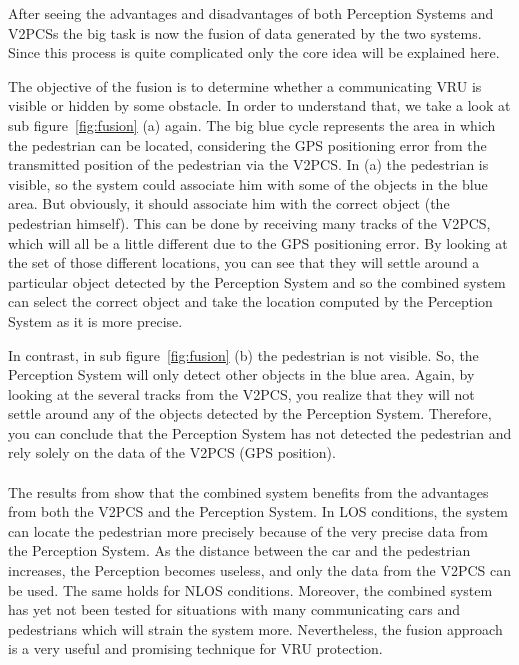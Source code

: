 \documentclass[]{ccs-thesis}
\begin{document}
After seeing the advantages and disadvantages of both Perception Systems and \acp{V2PCS} the big task is now the fusion of data generated by the two systems. Since this process is quite complicated only the core idea will be explained here.

The objective of the fusion is to determine whether a communicating \ac{VRU} is visible or hidden by some obstacle. In order to understand that, we take a look at sub figure~\ref{fig:fusion} (a) again. The big blue cycle represents the area in which the pedestrian can be located, considering the GPS positioning error from the transmitted position of the pedestrian via the \ac{V2PCS}. In (a) the pedestrian is visible, so the system could associate him with some of the objects in the blue area. But obviously, it should associate him with the correct object (the pedestrian himself). This can be done by receiving many tracks of the \ac{V2PCS}, which will all be a little different due to the GPS positioning error. By looking at the set of those different locations, you can see that they will settle around a particular object detected by the Perception System and so the combined system can select the correct object and take the location computed by the Perception System as it is more precise.

In contrast, in sub figure~\ref{fig:fusion} (b) the pedestrian is not visible. So, the Perception System will only detect other objects in the blue area. Again, by looking at the several tracks from the \ac{V2PCS}, you realize that they will not settle around any of the objects detected by the Perception System. Therefore, you can conclude that the Perception System has not detected the pedestrian and rely solely on the data of the \ac{V2PCS} (GPS position).
\\\\
The results from \cite{2016fusion} show that the combined system benefits from the advantages from both the \ac{V2PCS} and the Perception System. In \ac{LOS} conditions, the system can locate the pedestrian more precisely because of the very precise data from the Perception System. As the distance between the car and the pedestrian increases, the Perception becomes useless, and only the data from the \ac{V2PCS} can be used. The same holds for \ac{NLOS} conditions. Moreover, the combined system has yet not been tested for situations with many communicating cars and pedestrians which will strain the system more. Nevertheless, the fusion approach is a very useful and promising technique for \ac{VRU} protection.
\end{document}
